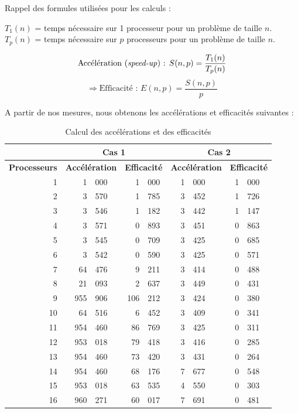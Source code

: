 \documentclass[a4paper,11pt]{report}
\begin{document}
Rappel des formules utilisées pour les calculs :

\noindent
$T_1(n)$ = temps nécessaire sur 1 processeur pour un problème de taille $n$.\\
$T_p(n)$ = temps nécessaire sur $p$ processeurs pour un problème de taille
$n$.

\bigskip\noindent
\[\textrm{Accélération (\emph{speed-up}) : } S(n, p) = \frac{T_1(n)}{T_p(n)}\]
\[\Rightarrow \textrm{Efficacité : } E(n, p) = \frac{S(n, p)}{p}\]

\noindent
A partir de nos mesures, nous obtenons les accélérations et efficacités
suivantes :

\begin{table}[!htb]
  \centering
  \begin{tabular}{|r|r@{,}l|r@{,}l|r@{,}l|r@{,}l|}
    \hline
    &
    \multicolumn{4}{c|}{\textbf{Cas 1}} &
    \multicolumn{4}{c|}{\textbf{Cas 2}}\\
    \hline
    \textbf{Processeurs} &
    \multicolumn{2}{c|}{\textbf{Accélération}} &
    \multicolumn{2}{c|}{\textbf{Efficacité}}   &
    \multicolumn{2}{c|}{\textbf{Accélération}} &
    \multicolumn{2}{c|}{\textbf{Efficacité}}\\
    \hline\hline
     1 &   1&000 &   1&000 & 1&000 & 1&000\\
     2 &   3&570 &   1&785 & 3&452 & 1&726\\
     3 &   3&546 &   1&182 & 3&442 & 1&147\\
     4 &   3&571 &   0&893 & 3&451 & 0&863\\
     5 &   3&545 &   0&709 & 3&425 & 0&685\\
     6 &   3&542 &   0&590 & 3&425 & 0&571\\
     7 &  64&476 &   9&211 & 3&414 & 0&488\\
     8 &  21&093 &   2&637 & 3&449 & 0&431\\
     9 & 955&906 & 106&212 & 3&424 & 0&380\\
    10 &  64&516 &   6&452 & 3&409 & 0&341\\
    11 & 954&460 &  86&769 & 3&425 & 0&311\\
    12 & 953&018 &  79&418 & 3&416 & 0&285\\
    13 & 954&460 &  73&420 & 3&431 & 0&264\\
    14 & 954&460 &  68&176 & 7&677 & 0&548\\
    15 & 953&018 &  63&535 & 4&550 & 0&303\\
    16 & 960&271 &  60&017 & 7&691 & 0&481\\
    \hline
  \end{tabular}
  \caption{Calcul des accélérations et des efficacités}
\end{table}
\end{document}
